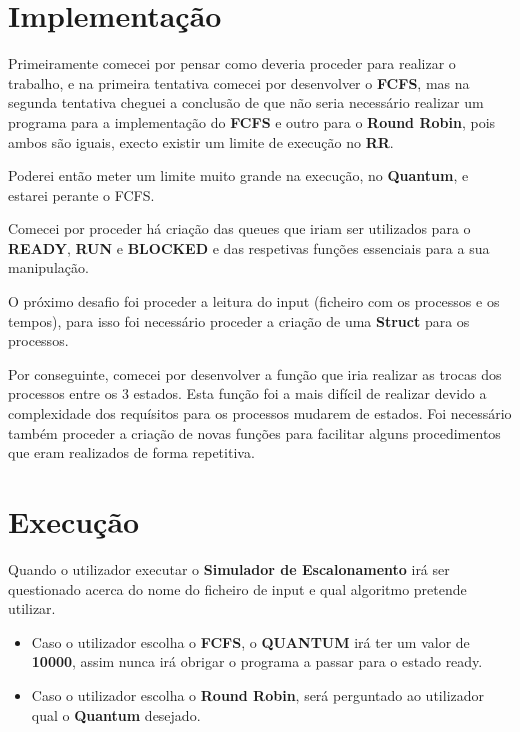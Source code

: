 \documentclass[11pt]{article}   %
\begin{document}
\section{Implementação}

\hspace{0,5cm}Primeiramente comecei por pensar como deveria proceder para realizar o trabalho, e na primeira tentativa comecei por desenvolver o \textbf{FCFS}, mas na segunda tentativa cheguei a conclusão de que não seria necessário realizar um programa para a implementação do \textbf{FCFS} e outro para o \textbf{Round Robin}, pois ambos são iguais, execto existir um limite de execução no \textbf{RR}. \par
Poderei então meter um limite muito grande na execução, no \textbf{Quantum}, e estarei perante o FCFS. \par
Comecei por proceder há criação das queues que iriam ser utilizados para o \textbf{READY}, \textbf{RUN} e \textbf{BLOCKED} e das respetivas funções essenciais para a sua manipulação. \par
O próximo desafio foi proceder a leitura do input (ficheiro com os processos e os tempos), para isso foi necessário proceder a criação de uma \textbf{Struct} para os processos.\par
Por conseguinte, comecei por desenvolver a função que iria realizar as trocas dos processos entre os 3 estados. Esta função foi a mais difícil de realizar devido a complexidade dos requísitos para os processos mudarem de estados. Foi necessário também proceder a criação de novas funções para facilitar alguns procedimentos que eram realizados de forma repetitiva.

\section{Execução}

\hspace{0,5cm}Quando o utilizador executar o \textbf{Simulador de Escalonamento} irá ser questionado acerca do nome do ficheiro de input e qual algoritmo pretende utilizar.
\begin{itemize}
    \item Caso o utilizador escolha o \textbf{FCFS}, o \textbf{QUANTUM} irá ter um valor de \textbf{10000}, assim nunca irá obrigar o programa a passar para o estado ready.
    \item Caso o utilizador escolha o \textbf{Round Robin}, será perguntado ao utilizador qual o \textbf{Quantum} desejado.
\end{itemize}
\end{document}
